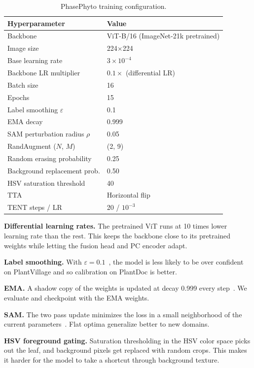 \documentclass[conference]{IEEEtran}
\begin{document}
\begin{table}[ht]
\caption{PhasePhyto training configuration.}
\label{tab:config}
\centering
\begin{tabular}{ll}
\toprule
Hyperparameter & Value \\
\midrule
Backbone & ViT-B/16 (ImageNet-21k pretrained) \\
Image size & 224$\times$224 \\
Base learning rate & $3 \times 10^{-4}$ \\
Backbone LR multiplier & $0.1\times$ (differential LR) \\
Batch size & 16 \\
Epochs & 15 \\
Label smoothing $\varepsilon$ & 0.1 \\
EMA decay & 0.999 \\
SAM perturbation radius $\rho$ & 0.05 \\
RandAugment ($N$, $M$) & (2, 9) \\
Random erasing probability & 0.25 \\
Background replacement prob. & 0.50 \\
HSV saturation threshold & 40 \\
TTA & Horizontal flip \\
TENT steps / LR & 20 / $10^{-3}$ \\
\bottomrule
\end{tabular}
\end{table}

\textbf{Differential learning rates.} The pretrained ViT runs at 10 times lower learning rate than the rest. This keeps the backbone close to its pretrained weights while letting the fusion head and PC encoder adapt.

\textbf{Label smoothing.} With $\varepsilon = 0.1$~\cite{Szegedy2016}, the model is less likely to be over confident on PlantVillage and so calibration on PlantDoc is better.

\textbf{EMA.} A shadow copy of the weights is updated at decay 0.999 every step~\cite{Izmailov2018}. We evaluate and checkpoint with the EMA weights.

\textbf{SAM.} The two pass update minimizes the loss in a small neighborhood of the current parameters~\cite{Foret2021}. Flat optima generalize better to new domains.

\textbf{HSV foreground gating.} Saturation thresholding in the HSV color space picks out the leaf, and background pixels get replaced with random crops. This makes it harder for the model to take a shortcut through background texture.
\end{document}
